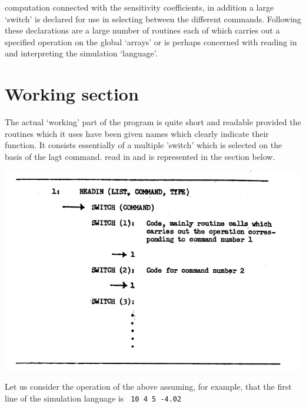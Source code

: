 computation connected with the sensitivity coefficients, in addition a large `switch' is declared for use in selecting between the different commands. Following these declarations are a large number of routines each of which carries out a specified operation on the global `arrays' or is perhaps concerned with reading in and interpreting the simulation `language'.

\section{Working section}

The actual `working' part of the program is quite short and readable provided the routines which it uses have been given names which clearly indicate their function. It consists essentially of a multiple 'switch' which is selected on the basis of the lagt command. read in and is represented in the section below.

\begin{center}
\includegraphics[max width=\textwidth]{figure4_4.png}
\end{center}

Let us consider the operation of the above assuming, for example, that the first line of the simulation language is {\tt {} 10 4 5 -4.02\textquotesingle}


